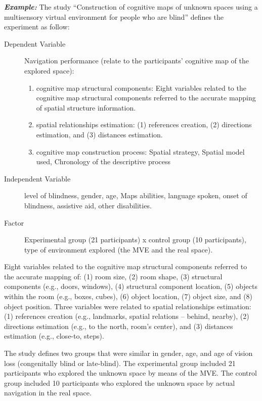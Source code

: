 \noindent \textit{\textbf{Example:}} The study ``Construction of cognitive maps of unknown spaces using a multisensory virtual environment for people who are blind''\cite{Lahav2008b} defines the experiment as follow:
\begin{description}
    \item[Dependent Variable] Navigation performance (relate to the participants’ cognitive map of the explored space):
    
   \begin{enumerate}[label=\alph*.]
       \item	cognitive map structural components: Eight variables related to the cognitive map structural components referred to the accurate mapping of spatial structure information.
       \item	spatial relationships estimation: (1) references creation, (2) directions estimation, and (3) distances estimation.
       \item	cognitive map construction process: Spatial strategy, Spatial model used, Chronology of the descriptive process 
   \end{enumerate}
   
   \item[Independent Variable] level of blindness, gender, age, Maps abilities, language spoken, onset of blindness, assistive aid, other disabilities.
   
   \item[Factor] Experimental group (21 participants) x control group (10 participants), type of environment explored (the MVE and the real space).
   
\end{description}

Eight variables related to the cognitive map structural components referred to the accurate mapping of: (1) room size, (2) room shape, (3) structural components (e.g., doors, windows), (4) structural component location, (5) objects within the room (e.g., boxes, cubes), (6) object location, (7) object size, and (8) object position. Three variables were related to spatial relationships estimation: (1) references creation (e.g., landmarks, spatial relations – behind, nearby), (2) directions estimation (e.g., to the north, room’s center), and (3) distances estimation (e.g., close-to, steps).

The study defines two groups that were similar in gender, age, and age of vision loss (congenitally blind or late-blind). The experimental group included 21 participants who explored the unknown space by means of the MVE. The control group included 10 participants who explored the unknown space by actual navigation in the real space.
\vspace{5mm}

